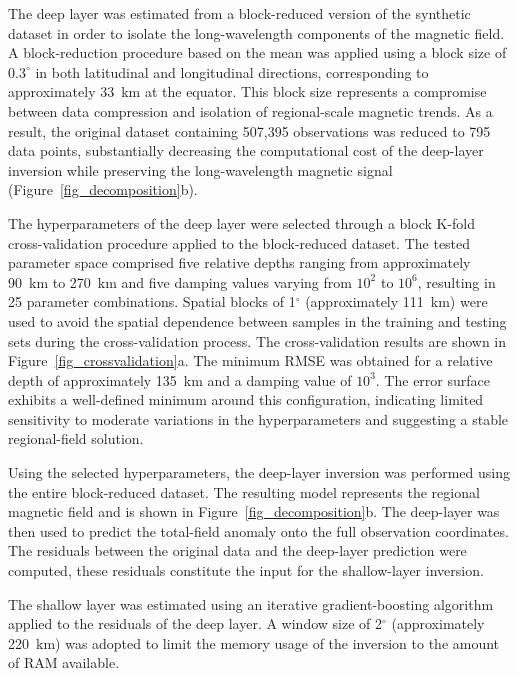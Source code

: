 \documentclass[a4paper,oneside,10pt]{book}
\begin{document}
The deep layer was estimated from a block-reduced version of the synthetic
dataset in order to isolate the long-wavelength components of the magnetic
field. A block-reduction procedure based on the mean was applied using a
block size of $0.3^{\circ}$ in both latitudinal and longitudinal directions,
corresponding to approximately 33~km at the equator. This block size
represents a compromise between data compression and isolation of
regional-scale magnetic trends.
As a result, the original dataset containing 507,395 observations was reduced
to 795 data points, substantially decreasing the computational cost of the
deep-layer inversion while preserving the long-wavelength magnetic signal
(Figure~\ref{fig_decomposition}b).

The hyperparameters of the deep layer were selected through a block K-fold
cross-validation procedure applied to the block-reduced dataset. The tested
parameter space comprised five relative depths ranging from approximately
90~km to 270~km and five damping values varying from $10^{2}$ to $10^{6}$,
resulting in 25 parameter combinations. Spatial blocks of 1$^{\circ}$ (approximately
111~km) were used to avoid the spatial dependence between samples
in the training and testing sets during the cross-validation process.
The cross-validation results are shown in
Figure~\ref{fig_crossvalidation}a. The minimum RMSE was obtained for a relative
depth of approximately 135~km and a damping value of $10^{3}$. The error
surface exhibits a well-defined minimum around this configuration,
indicating limited sensitivity to moderate variations in the
hyperparameters and suggesting a stable regional-field solution.

Using the selected hyperparameters, the deep-layer inversion was performed
using the entire block-reduced dataset. The resulting model represents the
regional magnetic field and is shown in
Figure~\ref{fig_decomposition}b. The deep-layer was then used to predict the
total-field anomaly onto the full observation coordinates.
The residuals between the original data and the deep-layer prediction were
computed, these residuals constitute the input for the shallow-layer inversion.

The shallow layer was estimated using an iterative gradient-boosting
algorithm applied to the residuals of the deep layer. A window size of
2$^{\circ}$ (approximately 220~km) was adopted to limit the memory usage of the
inversion to the amount of RAM available.
\end{document}
